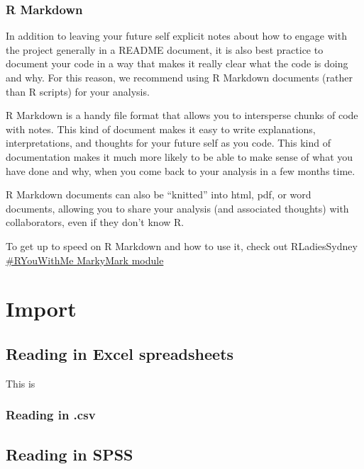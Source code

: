 \documentclass[
  letterpaper,
  DIV=11,
  numbers=noendperiod]{scrreprt}
\begin{document}
\subsection{R Markdown}\label{r-markdown}

In addition to leaving your future self explicit notes about how to
engage with the project generally in a README document, it is also best
practice to document your code in a way that makes it really clear what
the code is doing and why. For this reason, we recommend using R
Markdown documents (rather than R scripts) for your analysis.

R Markdown is a handy file format that allows you to intersperse chunks
of code with notes. This kind of document makes it easy to write
explanations, interpretations, and thoughts for your future self as you
code. This kind of documentation makes it much more likely to be able to
make sense of what you have done and why, when you come back to your
analysis in a few months time.

R Markdown documents can also be ``knitted'' into html, pdf, or word
documents, allowing you to share your analysis (and associated thoughts)
with collaborators, even if they don't know R.

To get up to speed on R Markdown and how to use it, check out
RLadiesSydney
\href{https://rladiessydney.org/courses/ryouwithme/04-markymark-1/}{\#RYouWithMe
MarkyMark module}


\chapter{Import}\label{import}

\section{Reading in Excel
spreadsheets}\label{reading-in-excel-spreadsheets}

This is

\subsection{Reading in .csv}\label{reading-in-.csv}

\section{Reading in SPSS}\label{reading-in-spss}
\end{document}
